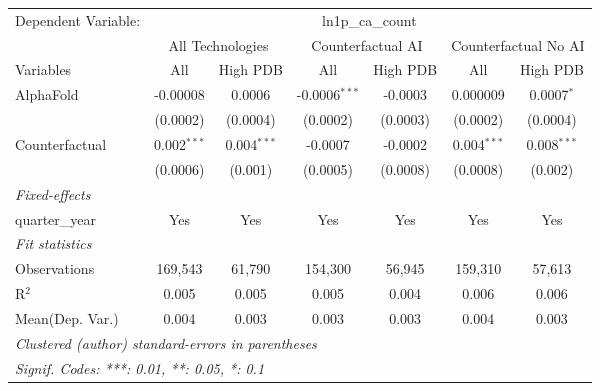 \begingroup
\centering
\begin{tabular}{lcccccc}
   \tabularnewline \midrule \midrule
   Dependent Variable: & \multicolumn{6}{c}{ln1p\_ca\_count}\\
 & \multicolumn{2}{c}{All Technologies} & \multicolumn{2}{c}{Counterfactual AI} & \multicolumn{2}{c}{Counterfactual No AI} \\
\cmidrule(lr){1-1}\cmidrule(lr){2-3} \cmidrule(lr){4-5} \cmidrule(lr){6-7}
Variables & \multicolumn{1}{c}{All} & \multicolumn{1}{c}{High PDB} & \multicolumn{1}{c}{All} & \multicolumn{1}{c}{High PDB} & \multicolumn{1}{c}{All} & \multicolumn{1}{c}{High PDB} \\
\cmidrule(lr){1-1}\cmidrule(lr){2-2} \cmidrule(lr){3-3} \cmidrule(lr){4-4} \cmidrule(lr){5-5} \cmidrule(lr){6-6} \cmidrule(lr){7-7}
   AlphaFold      & -0.00008      & 0.0006        & -0.0006$^{***}$ & -0.0003  & 0.000009      & 0.0007$^{*}$\\   
                  & (0.0002)      & (0.0004)      & (0.0002)        & (0.0003) & (0.0002)      & (0.0004)\\   
   Counterfactual & 0.002$^{***}$ & 0.004$^{***}$ & -0.0007         & -0.0002  & 0.004$^{***}$ & 0.008$^{***}$\\   
                  & (0.0006)      & (0.001)       & (0.0005)        & (0.0008) & (0.0008)      & (0.002)\\   
   \midrule
   \emph{Fixed-effects}\\
   quarter\_year  & Yes           & Yes           & Yes             & Yes      & Yes           & Yes\\  
   \midrule
   \emph{Fit statistics}\\
   Observations   & 169,543       & 61,790        & 154,300         & 56,945   & 159,310       & 57,613\\  
   R$^2$          & 0.005         & 0.005         & 0.005           & 0.004    & 0.006         & 0.006\\  
Mean(Dep. Var.) & 0.004 & 0.003 & 0.003 & 0.003 & 0.004 & 0.003 \\
   \midrule \midrule
   \multicolumn{7}{l}{\emph{Clustered (author) standard-errors in parentheses}}\\
   \multicolumn{7}{l}{\emph{Signif. Codes: ***: 0.01, **: 0.05, *: 0.1}}\\
\end{tabular}
\par\endgroup
